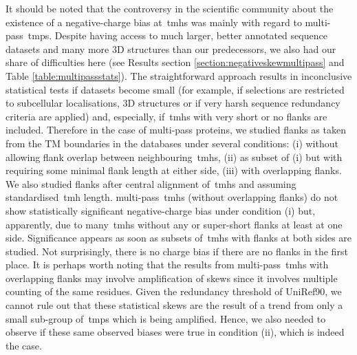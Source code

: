 It should be noted that the controversy in the scientific community about the existence of a negative\--charge bias at~\gls{tmh}s was mainly with regard to multi\--pass~\gls{tmp}s.
Despite having access to much larger, better annotated sequence datasets and many more 3D structures than our predecessors, we also had our share of difficulties here (see Results section \ref{section:negativeskewmultipass} and Table \ref{table:multipassstats}).
The straightforward approach results in inconclusive statistical tests if datasets become small (for example, if selections are restricted to subcellular localisations, 3D structures or if very harsh sequence redundancy criteria are applied) and, especially, if~\gls{tmh}s with very short or no flanks are included.
Therefore in the case of multi\--pass proteins, we studied flanks as taken from the TM boundaries in the databases under several conditions: (i) without allowing flank overlap between neighbouring~\gls{tmh}s, (ii) as subset of (i) but with requiring some minimal flank length at either side, (iii) with overlapping flanks.
We also studied flanks after central alignment of~\gls{tmh}s and assuming standardised~\gls{tmh} length.
multi\--pass~\gls{tmh}s (without overlapping flanks) do not show statistically significant negative\--charge bias under condition (i) but, apparently, due to many~\gls{tmh}s without any or super-short flanks at least at one side.
Significance appears as soon as subsets of~\gls{tmh}s with flanks at both sides are studied.
Not surprisingly, there is no charge bias if there are no flanks in the first place.
It is perhaps worth noting that the results from multi\--pass~\gls{tmh}s with overlapping flanks may involve amplification of skews since it involves multiple counting of the same residues.
Given the redundancy threshold of UniRef90, we cannot rule out that these statistical skews are the result of a trend from only a small sub-group of~\gls{tmp}s which is being amplified.
Hence, we also needed to observe if these same observed biases were true in condition (ii), which is indeed the case.

